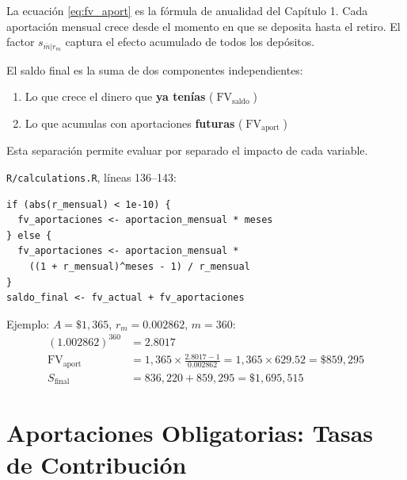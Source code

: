 \documentclass[11pt,a4paper]{report}
\theoremstyle{remark}
\DeclareMathOperator{\FV}{FV}
\begin{document}
\begin{tcolorbox}[colback=green!5!white, colframe=green!50!black, title=\textbf{Intuici\'on}]
La ecuaci\'on \eqref{eq:fv_aport} es la f\'ormula de anualidad del Cap\'itulo 1. Cada aportaci\'on mensual crece desde el momento en que se deposita hasta el retiro. El factor $s_{\overline{m}|r_m}$ captura el efecto acumulado de todos los dep\'ositos.

El saldo final es la suma de dos componentes independientes:
\begin{enumerate}
  \item Lo que crece el dinero que \textbf{ya ten\'ias} ($\FV_{\text{saldo}}$)
  \item Lo que acumulas con aportaciones \textbf{futuras} ($\FV_{\text{aport}}$)
\end{enumerate}

Esta separaci\'on permite evaluar por separado el impacto de cada variable.
\end{tcolorbox}

\begin{tcolorbox}[colback=orange!5!white, colframe=orange!75!black, title=\textbf{Aplicaci\'on en C\'odigo}]
\texttt{R/calculations.R}, l\'ineas 136--143:
\begin{lstlisting}
if (abs(r_mensual) < 1e-10) {
  fv_aportaciones <- aportacion_mensual * meses
} else {
  fv_aportaciones <- aportacion_mensual *
    ((1 + r_mensual)^meses - 1) / r_mensual
}
saldo_final <- fv_actual + fv_aportaciones
\end{lstlisting}

Ejemplo: $A = \$1{,}365$, $r_m = 0.002862$, $m = 360$:
\begin{align*}
(1.002862)^{360} &= 2.8017 \\
\FV_{\text{aport}} &= 1{,}365 \times \frac{2.8017 - 1}{0.002862} = 1{,}365 \times 629.52 = \$859{,}295 \\
S_{\text{final}} &= 836{,}220 + 859{,}295 = \$1{,}695{,}515
\end{align*}
\end{tcolorbox}

\section{Aportaciones Obligatorias: Tasas de Contribuci\'on}
\end{document}
